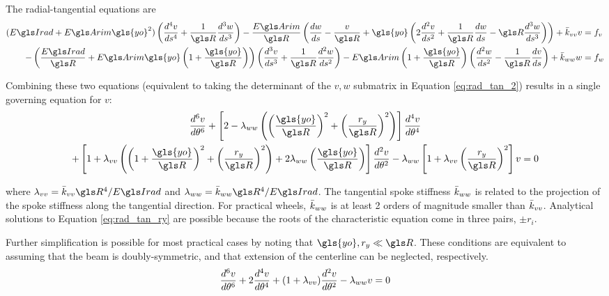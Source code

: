 \documentclass[\rootdir/thesis.tex]{subfiles}
\begin{document}
The radial-tangential equations are
\begin{subequations}
\begin{align}
\label{eq:rad_tan_2}
(\EIr + \EA \gls{yo}^2)\left( \ds{v}{4} + \frac{1}{\R}\ds{w}{3} \right) -
    \frac{\EA}{\R}\left( \frac{dw}{ds} - \frac{v}{\R} +\gls{yo}\left(2\ds{v}{2} + \frac{1}{\R}\frac{dw}{ds} -
    \R\ds{w}{3}\right) \right) +\bar{k}_{vv}v &= f_v\\
-\left( \frac{\EIr}{\R} + \EA \gls{yo}\left( 1 + \frac{\gls{yo}}{\R} \right) \right)
    \left(\ds{v}{3} + \frac{1}{\R}\ds{w}{2} \right) -
    \EA\left(1+\frac{\gls{yo}}{\R} \right) \left(\ds{w}{2} - \frac{1}{\R}\frac{dv}{ds} \right) + \bar{k}_{ww}w &= f_w
\end{align}
\end{subequations}

Combining these two equations (equivalent to taking the determinant of the $v,w$ submatrix in Equation \eqref{eq:rad_tan_2}) results in a single governing equation for $v$:
\begin{multline}
\label{eq:rad_tan_ry}
\dt{v}{6} + \left[2-\lr_{ww}\left(\left(\frac{\gls{yo}}{\R}\right)^2 +
                                        \left(\frac{\ry}{\R}\right)^2 \right) \right] \dt{v}{4}\\
          + \left[1+\lr_{vv}\left(\left(1+\frac{\gls{yo}}{\R}\right)^2+\left(\frac{\ry}{\R}\right)^2\right)
                   +2\lr_{ww}\left(\frac{\gls{yo}}{\R}\right)\right]\dt{v}{2}
          - \lr_{ww}\left[1+\lr_{vv}\left(\frac{\ry}{\R}\right)^2\right] v = 0
\end{multline}

where $\lr_{vv}=\kvv\R^4/\EIr$ and $\lr_{ww}=\kww\R^4/\EIr$. The tangential spoke stiffness $\bar{k}_{ww}$ is related to the projection of the spoke stiffness along the tangential direction. For practical wheels, $\bar{k}_{ww}$ is at least 2 orders of magnitude smaller than $\bar{k}_{vv}$. Analytical solutions to Equation \eqref{eq:rad_tan_ry} are possible because the roots of the characteristic equation come in three pairs, $\pm r_i$.

Further simplification is possible for most practical cases by noting that $\gls{yo},\ry \ll \R$. These conditions are equivalent to assuming that the beam is doubly-symmetric, and that extension of the centerline can be neglected, respectively.
\begin{equation}
\label{eq:rad_tan}
\frac{d^6v}{d\theta^6} + 2\frac{d^4v}{d\theta^4}+(1+\lambda_{vv})\frac{d^2v}{d\theta^2} - \lambda_{ww}v=0
\end{equation}
\end{document}
